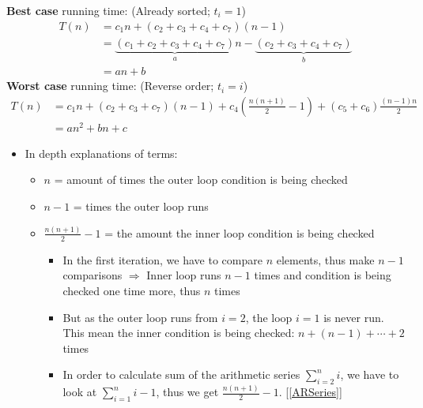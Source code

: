 \textbf{Best case} running time: (Already sorted; $t_i=1$)
\begin{align*}
    T(n)&=c_1n +(c_2+c_3+c_4+c_7)(n-1) \\
    &= \underbrace{(c_1+c_2+c_3+c_4+c_7)}_{a}n -\underbrace{(c_2+c_3+c_4+c_7)}_{b} \\
    &=an+b
\end{align*}
\textbf{Worst case} running time: (Reverse order; $t_i=i$)
\begin{align*}
    T(n)&=c_1n+(c_2+c_3+c_7)(n-1)+c_4\left (\frac{n(n+1)}{2} -1 \right) + (c_5+c_6) \frac{(n-1)n}{2} \\
    &= an^2+bn+c
\end{align*}
\begin{itemize}
    \item In depth explanations of terms:
    \begin{itemize}
        \item $n$ = amount of times the outer loop condition is being checked 
        \item $n-1$ = times the outer loop runs
        \item $\frac{n(n+1)}{2}-1$ = the amount the inner loop condition is being checked
        \begin{itemize}
            \item In the first iteration, we have to compare $n$ elements, thus make $n-1$ comparisons $\Rightarrow$ Inner loop runs $n-1$ times and condition is being checked one time more, thus $n$ times
            \item But as the outer loop runs from $i=2$, the loop $i=1$ is never run. This mean the inner condition is being checked: $n+(n-1)+\cdots+2$ times 
            \item In order to calculate sum of the arithmetic series $\sum_{i=2}^n i$, we have to look at $\sum_{i=1}^n i-1$, thus we get $\frac{n(n+1)}{2} - 1$. [\ref{ARSeries}]
        \end{itemize}
    \end{itemize}
\end{itemize}


